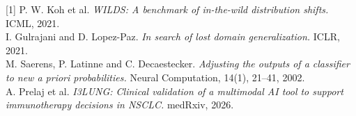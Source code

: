 \documentclass[10pt]{article}
\begin{document}
\vspace{4pt}
{\footnotesize
[1] P. W. Koh et al. \emph{WILDS: A benchmark of in-the-wild distribution
shifts.} ICML, 2021.\\
[2] I. Gulrajani and D. Lopez-Paz. \emph{In search of lost domain
generalization.} ICLR, 2021.\\
[3] M. Saerens, P. Latinne and C. Decaestecker. \emph{Adjusting the outputs of a
classifier to new a priori probabilities.} Neural Computation, 14(1),
21--41, 2002.\\
[4] A. Prelaj et al. \emph{I3LUNG: Clinical validation of a multimodal AI tool
to support immunotherapy decisions in NSCLC.} medRxiv, 2026.
}
\end{document}
